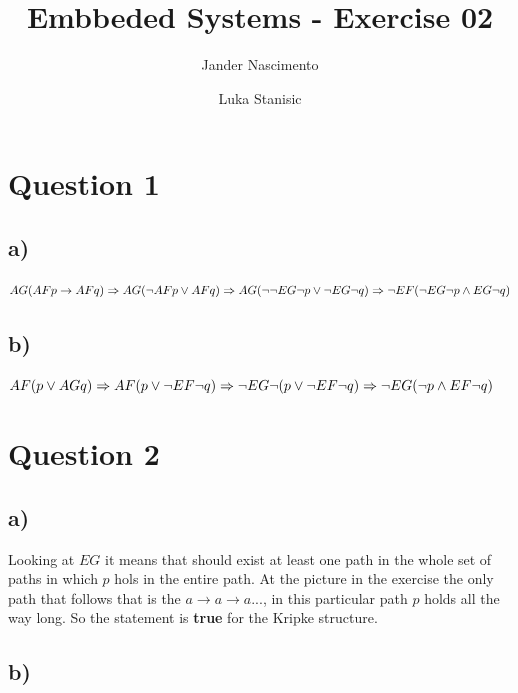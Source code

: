 \documentclass[a4paper]{article}
\begin{document}
\title{Embbeded Systems - Exercise 02}

\author{Jander Nascimento \and Luka Stanisic}

\maketitle

\section{Question 1}

\subsection*{a)}

$
AG(AF p \to AF q) \Rightarrow
\newline AG (\neg AF p \lor AF q) \Rightarrow
\newline AG( \neg \neg EG \neg p \lor \neg EG \neg q ) \Rightarrow
\newline \neg EF ( \neg EG \neg p \land EG \neg q )
$

\subsection*{b)}

$
AF(p \lor AG q) \Rightarrow
\newline AF (p \lor \neg EF \neg q) \Rightarrow
\newline \neg  EG \neg (p \lor \neg EF \neg q) \Rightarrow
\newline \neg EG (\neg p \land  EF \neg q)
$

\section{Question 2}

\subsection*{a)}
Looking at $EG$ it means that should exist at least one path in the whole set of paths in which $p$ hols in the entire path. 
At the picture in the exercise the only path that follows that is the $a \to a \to a ...$, in this particular path $p$ holds all the way long. So the statement is \textbf{true} for the Kripke structure. 

\subsection*{b)}
\end{document}
